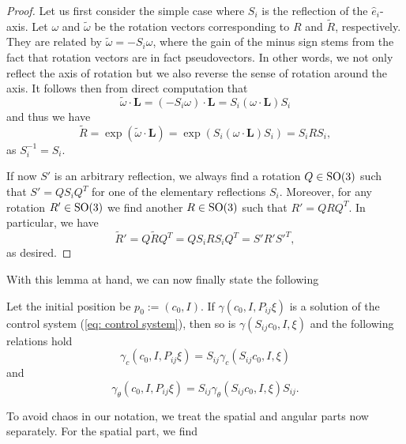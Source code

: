 \begin{proof}
Let us first consider the simple case where $S_i$ is the reflection of the $\hat{e}_i$-axis. Let $\omega$ and $\tilde{\omega}$ be the rotation vectors corresponding to $R$ and $\tilde{R}$, respectively. They are related by $\tilde{\omega} = -S_i \omega$, where the gain of the minus sign stems from the fact that rotation vectors are in fact pseudovectors. In other words, we not only reflect the axis of rotation but we also reverse the sense of rotation around the axis. It follows then from direct computation that
\begin{equation}
\label{eq: transformation of rotation axis}
 \tilde{\omega} \cdot \mathbf{L} = (-S_i\omega) \cdot \mathbf{L} = S_i(\omega \cdot \mathbf{L})S_i
\end{equation}
and thus we have
\begin{equation}
\tilde{R} = \exp(\tilde{\omega} \cdot \mathbf{L}) = \exp(S_i(\omega \cdot \mathbf{L})S_i) = S_iRS_i,
\end{equation}
as $S_i^{-1} = S_i$.

If now $S'$ is an arbitrary reflection, we always find a rotation $Q \in \operatorname{SO}(3)$ such that $S' = Q S_i Q^T$ for one of the elementary reflections $S_i$. Moreover, for any rotation $R' \in \operatorname{SO}(3)$ we find another $R \in \operatorname{SO}(3)$ such that $R' = Q R Q^T$. In particular, we have
\begin{equation}
\tilde{R}' = Q \tilde{R} Q^T = Q S_iRS_i Q^T = S' R' S'^T,
\end{equation}
as desired.
\end{proof}

With this lemma at hand, we can now finally state the following

\begin{condition}
\label{cond:swap}
Let the initial position be $p_0 := (c_0, I)$. If $\gamma(c_0, I, P_{ij} \xi)$ is a solution of the control system (\ref{eq: control system}), then so is $\gamma(S_{ij}c_0, I, \xi)$ and the following relations hold
\begin{equation}
	\gamma_c(c_0, I, P_{ij} \xi) = S_{ij} \gamma_c(S_{ij}c_0, I, \xi)
\end{equation}
and
\begin{equation}
	\gamma_{\theta}(c_0, I, P_{ij} \xi ) = S_{ij} \gamma_{\theta} (S_{ij} c_0, I, \xi) S_{ij}.
\end{equation}
\end{condition}
To avoid chaos in our notation, we treat the spatial and angular parts now separately. For the spatial part, we find

